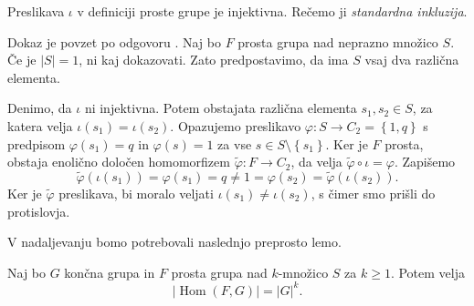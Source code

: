 \begin{opomba}\label{opm_standardna_inkluzija}
Preslikava $\iota$ v definiciji proste grupe je injektivna. Rečemo ji \emph{standardna inkluzija}.
\end{opomba}
\begin{dokaz}
  Dokaz je povzet po odgovoru \cite{math_stack_4689399_standardna_inkluzija}.
Naj bo $F$ prosta grupa nad neprazno množico $S$. Če je $\lvert S \rvert = 1$, ni kaj dokazovati. Zato predpostavimo, da ima $S$ vsaj dva različna elementa.

Denimo, da $\iota$ ni injektivna. Potem obstajata različna elementa $s_1, s_2 \in S$, za katera velja $\iota(s_1) = \iota(s_2)$. Opazujemo preslikavo $\varphi: S \to C_2 = \left\{ 1, q\right\}$ s predpisom
$\varphi(s_1) = q$ in $\varphi(s) = 1$ za vse $s \in  S \setminus \left\{  s_1 \right\}$. Ker je $F$ prosta, obstaja enolično določen homomorfizem $\tilde{\varphi} : F \to C_2$, da velja $\tilde{\varphi} \circ \iota = \varphi$.
Zapišemo \begin{equation*}
\tilde{\varphi}(\iota(s_1)) = \varphi(s_1) = q \neq 1 = \varphi(s_2) = \tilde{\varphi}(\iota(s_2)).
\end{equation*}  
Ker je $\tilde{\varphi}$ preslikava, bi moralo veljati $\iota(s_1) \neq \iota(s_2)$, s čimer smo prišli do protislovja.
\end{dokaz}
V nadaljevanju bomo potrebovali naslednjo preprosto lemo.
\begin{lema}
\label{lem_moc_homomorfizmov_proste_grupe}
Naj bo $G$ končna grupa in $F$ prosta grupa nad $k$-množico $S$ za $k \ge 1$. Potem velja \begin{equation*}
\lvert \operatorname{Hom}(F, G) \rvert = \lvert G \rvert^{k}.  
\end{equation*}  
\end{lema}
